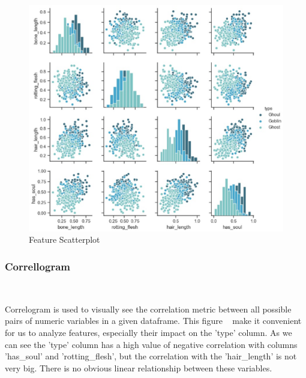 \begin{figure}[htbp]
	\centering
	\includegraphics[scale=0.4]{figures/pairplot.eps}
	\caption{Feature Scatterplot}\label{fig:feature_scatterplot}
\end{figure}

\subsubsection{Correllogram}
\

Correlogram is used to 
visually see the correlation metric 
between all possible pairs of numeric variables 
in a given dataframe. 
This figure ~ 
make it convenient for us to analyze features,
especially their impact on the 'type' column. 
As we can see the 'type' column 
has a high value of negative correlation 
with columns 'has\_soul' and 'rotting\_flesh',
but the correlation 
with the 'hair\_length' is not very big.
There is no obvious linear relationship 
between these variables.

